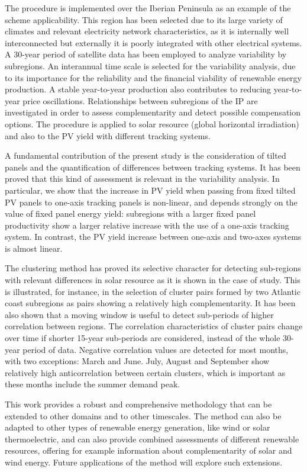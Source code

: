 The procedure is implemented over the Iberian Peninsula as an example of the scheme applicability. This region has been selected due to its large variety of climates and relevant electricity network characteristics, as it is internally well interconnected but externally it is poorly integrated with other electrical systems. A 30-year period of satellite data has been employed to analyze variability by subregions. An interannual time scale is selected for the variability analysis, due to its importance for the reliability and the financial viability of renewable energy production. A stable year-to-year production also contributes to reducing year-to-year price oscillations. Relationships between subregions of the IP are investigated in order to assess complementarity and detect possible compensation options. The procedure is applied to solar resource (global horizontal irradiation) and also to the PV yield with different tracking systems.

A fundamental contribution of the present study is the consideration of tilted panels and the quantification of differences between tracking systems. It has been proved that this kind of assessment is relevant in the variability analysis. In particular, we show that the increase in PV yield when passing from fixed tilted PV panels to one-axis tracking panels is non-linear, and depends strongly on the value of fixed panel energy yield: subregions with a larger fixed panel productivity show a larger relative increase with the use of a one-axis tracking system. In contrast, the PV yield increase between one-axis and two-axes systems is almost linear.

The clustering method has proved its selective character for detecting sub-regions with relevant differences in solar resource as it is shown in the case of study. This is illustrated, for instance, in the selection of cluster pairs formed by two Atlantic coast subregions as pairs showing a relatively high complementarity. It has been also shown that a moving window is useful to detect sub-periods of higher correlation between regions. The correlation characteristics of cluster pairs change over time if shorter 15-year sub-periods are considered, instead of the whole 30-year period of data. Negative correlation values are detected for most months, with two exceptions: March and June. July, August and September show relatively high anticorrelation between certain clusters, which is important as these months include the summer demand peak. 

This work provides a robust and comprehensive methodology that can be extended to other domains and to other timescales. The method can also be adapted to other types of renewable energy generation, like wind or solar thermoelectric, and can also provide combined assessments of different renewable resources, offering for example information about complementarity of solar and wind energy. Future applications of the method will explore such extensions.

